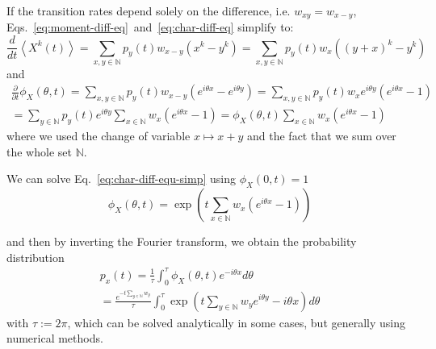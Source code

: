     If the transition rates depend solely on the difference, i.e. $w_{xy}=w_{x-y}$, Eqs.~\eqref{eq:moment-diff-eq}~and~\eqref{eq:char-diff-eq} simplify to:
    \begin{equation}
    \label{eq:moment-diff-eq-rates-diff}
        \frac{d}{dt}\left\langle X^k(t) \right\rangle
        = \sum_{x,y\in\mathbb{N}} p_y(t) w_{x-y} \left(x^k - y^k\right)
        = \sum_{x,y\in\mathbb{N}} p_y(t) w_{x} \left((y+x)^k - y^k\right)
    \end{equation}
    and 
    \begin{multline}
    \label{eq:char-diff-equ-simp}
        \frac{\partial}{\partial t}\phi_X(\theta, t) 
        = \sum_{x,y\in\mathbb{N}} p_y(t) w_{x-y} \left(e^{i\theta x} - e^{i\theta y}\right)
        = \sum_{x,y\in\mathbb{N}} p_y(t) w_{x} e^{i\theta y} \left(e^{i\theta x} - 1\right) \\
        = \sum_{y\in\mathbb{N}} p_y(t) e^{i\theta y} \sum_{x\in\mathbb{N}} w_{x} \left(e^{i\theta x} - 1\right)
        = \phi_X(\theta, t) \sum_{x\in\mathbb{N}} w_{x} \left(e^{i\theta x} - 1\right)
    \end{multline}
    where we used the change of variable $x\mapsto x+y$ and the fact that we sum over the whole set $\mathbb{N}$.
    
    We can solve Eq.~\eqref{eq:char-diff-equ-simp} using $\phi_X(0, t)=1$
    \begin{equation}
        \phi_X(\theta, t) = \exp\left(t \sum_{x\in\mathbb{N}} w_{x} \left(e^{i\theta x} - 1\right)\right)
    \end{equation}
    
    and then by inverting the Fourier transform, we obtain the probability distribution
    \begin{multline}
        p_x(t) = \frac{1}{\tau}\int_0^\tau \phi_X(\theta, t) e^{-i\theta x} d\theta \\
        = \frac{e^{-t \sum_{y\in\mathbb{N}} w_{y}}}{\tau}\int_0^\tau \exp\left(t \sum_{y\in\mathbb{N}} w_{y} e^{i\theta y} -i\theta x\right) d\theta
    \end{multline}
    with $\tau:=2\pi$, which can be solved analytically in some cases, but generally using numerical methods.
    

